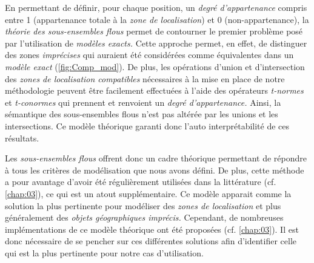 En permettant de définir, pour chaque position, un \emph{degré
  d'appartenance} compris entre 1 (appartenance totale à la \emph{zone
  de localisation}) et 0 (non-appartenance), la \emph{théorie des
  sous-ensembles flous} permet de contourner le premier problème posé
par l'utilisation de \emph{modèles exacts.} Cette approche permet, en
effet, de distinguer des zones \emph{imprécises} qui auraient été
considérées comme équivalentes dans un \emph{modèle exact}
(\autoref{fig:Comp_mod}). De plus, les opérations d'union et
d'intersection des \emph{zones de localisation compatibles}
nécessaires à la mise en place de notre méthodologie peuvent être
facilement effectuées à l'aide des opérateurs \emph{t-normes} et
\emph{t-conormes} qui prennent et renvoient un \emph{degré
  d'appartenance.} Ainsi, la sémantique des sous-ensembles flous n'est
pas altérée par les unions et les intersections. Ce modèle théorique
garanti donc l'auto interprétabilité de ces résultats.

Les \emph{sous-ensembles flous} offrent donc un cadre théorique
permettant de répondre à tous les critères de modélisation que nous
avons défini. De plus, cette méthode a pour avantage d'avoir été
régulièrement utilisées dans la littérature (cf. \autoref{chap:03}),
ce qui est un atout supplémentaire. Ce modèle apparait comme la
solution la plus pertinente pour modéliser des \emph{zones de
  localisation} et plus généralement des \emph{objets géographiques
  imprécis.} Cependant, de nombreuses implémentations de ce modèle
théorique ont été proposées (cf. \autoref{chap:03}). Il est donc
nécessaire de se pencher sur ces différentes solutions afin
d'identifier celle qui est la plus pertinente pour notre cas
d'utilisation.


